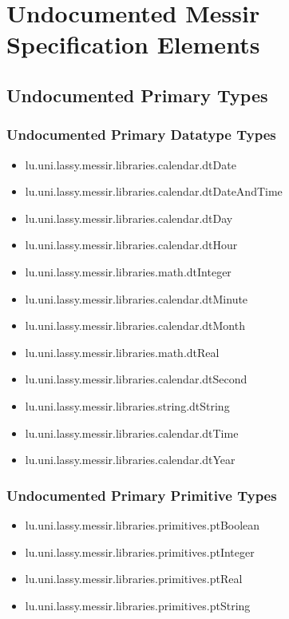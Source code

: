 	
\chapter{Undocumented Messir Specification Elements}











\section[Undocumented Primary Types]{Undocumented Primary Types}


\subsection[Undocumented Primary Datatype Types]{Undocumented Primary Datatype Types}
\begin{itemize}
\item lu.uni.lassy.messir.libraries.calendar.dtDate 
\item lu.uni.lassy.messir.libraries.calendar.dtDateAndTime 
\item lu.uni.lassy.messir.libraries.calendar.dtDay 
\item lu.uni.lassy.messir.libraries.calendar.dtHour 
\item lu.uni.lassy.messir.libraries.math.dtInteger 
\item lu.uni.lassy.messir.libraries.calendar.dtMinute 
\item lu.uni.lassy.messir.libraries.calendar.dtMonth 
\item lu.uni.lassy.messir.libraries.math.dtReal 
\item lu.uni.lassy.messir.libraries.calendar.dtSecond 
\item lu.uni.lassy.messir.libraries.string.dtString 
\item lu.uni.lassy.messir.libraries.calendar.dtTime 
\item lu.uni.lassy.messir.libraries.calendar.dtYear 
\end{itemize}



\subsection[Undocumented Primary Primitive Types]{Undocumented Primary Primitive Types}
\begin{itemize}
\item lu.uni.lassy.messir.libraries.primitives.ptBoolean 
\item lu.uni.lassy.messir.libraries.primitives.ptInteger 
\item lu.uni.lassy.messir.libraries.primitives.ptReal 
\item lu.uni.lassy.messir.libraries.primitives.ptString 
\end{itemize}













